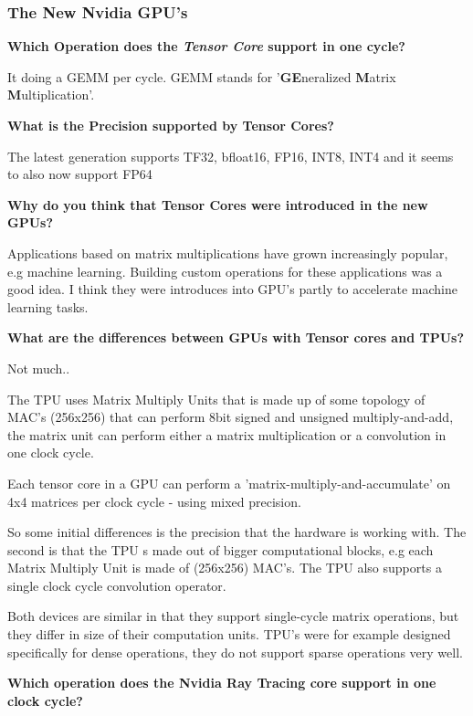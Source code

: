 \documentclass{article}
\begin{document}
\subsubsection*{The New Nvidia GPU's}%
\label{ssub:the_new_nvidia_gpu_s}



\textbf{Which Operation does the \textit{Tensor Core} support in one cycle?}%


It doing a GEMM per cycle.  GEMM stands for '\textbf{GE}neralized \textbf{M}atrix \textbf{M}ultiplication'.

\textbf{What is the Precision supported by Tensor Cores?}%

The latest generation supports TF32, bfloat16, FP16, INT8, INT4 and it seems to also now support FP64 \cite{tensorprecision}

\textbf{Why do you think that Tensor Cores were introduced in the new GPUs?}%

Applications based on matrix multiplications have grown increasingly popular, e.g machine learning. Building custom operations for these applications was a good
idea. I think they were introduces into GPU's partly to accelerate machine learning tasks.

\textbf{What are the differences between GPUs with Tensor cores and TPUs?}

Not much.. 

The TPU uses Matrix Multiply Units that is made up of some topology of MAC's (256x256) that can perform 8bit signed and unsigned multiply-and-add, the matrix
unit can perform either a matrix multiplication or a convolution in one clock cycle. \cite{jouppi2017datacenter}

Each tensor core in a GPU can perform a 'matrix-multiply-and-accumulate' on 4x4 matrices per clock cycle - using mixed precision. \cite{nvidiatensorcores}

So some initial differences is the precision that the hardware is working with. The second is that the TPU s made out of bigger computational
blocks, e.g each Matrix Multiply Unit is made of (256x256) MAC's. The TPU also supports a single clock cycle convolution operator. 

Both devices are similar in that they support single-cycle matrix operations, but they differ in size of their computation units. TPU's were for example designed
specifically for dense operations, they do not support sparse operations very well.


\textbf{Which operation does the Nvidia Ray Tracing core support in one clock cycle?}
\end{document}

